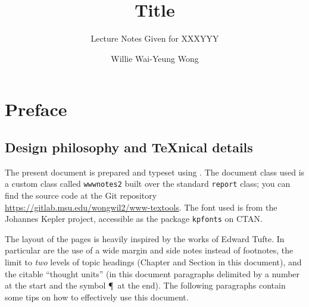 \documentclass[noocg]{wwwnotes2}
\title{Title}
\subtitle{Lecture Notes Given for XXXYYY}
\author{Willie Wai-Yeung Wong}
\begin{document}
\maketitle


\chapter*{Preface}

\section*{Design philosophy and \TeX{}nical details}

The present document is prepared and typeset using \LaTeXe. The document class used is a custom class called \texttt{wwwnotes2} built over the standard \texttt{report} class; you can find the source code at the Git repository \url{https://gitlab.msu.edu/wongwil2/www-textools}. The font used is from the Johannes Kepler project, accessible as the package \texttt{kpfonts} on CTAN.    
 
The layout of the pages is heavily inspired by the works of Edward Tufte. In particular are the use of a wide margin and side notes instead of footnotes, the limit to \emph{two} levels of topic headings (Chapter and Section in this document), and the citable ``thought units'' (in this document paragraphs delimited by a number at the start and the symbol \P\ at the end). The following paragraphs contain some tips on how to effectively use this document. 
  
\end{document}
